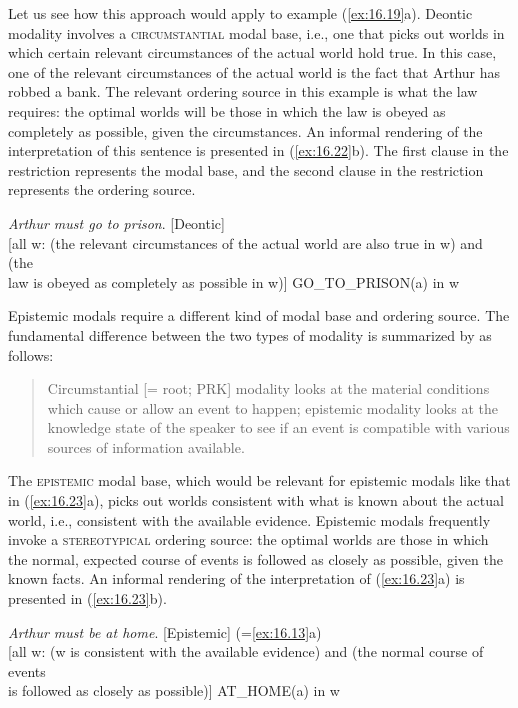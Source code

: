 Let us see how this approach would apply to example (\ref{ex:16.19}a). Deontic modality involves a \textsc{circumstantial} modal base, i.e., one that picks out worlds in which certain relevant circumstances of the actual world hold true. In this case, one of the relevant circumstances of the actual world is the fact that Arthur has robbed a bank. The relevant ordering source in this example is what the law requires: the optimal worlds will be those in which the law is obeyed as completely as possible, given the circumstances. An informal rendering of the interpretation of this sentence is presented in (\ref{ex:16.22}b). The first clause in the restriction represents the modal base, and the second clause in the restriction represents the ordering source.


\ea \label{ex:16.22}
\ea  \textit{Arthur must go to prison}.  [Deontic]\\
\ex{} [all w: (the relevant circumstances of the actual world are also true in w) and (the \\
  law is obeyed as completely as possible in w)] GO\_TO\_PRISON(a) in w
\z
\z


Epistemic modals require a different kind of modal base and ordering source. The fundamental difference between the two types of modality is summarized by \citet[1494]{Hacquard2011} as follows:


\begin{quote}
Circumstantial [= root; PRK] modality looks at the material conditions which cause or allow an event to happen; epistemic modality looks at the knowledge state of the speaker to see if an event is compatible with various sources of information available.
\end{quote}


The \textsc{epistemic} modal base, which would be relevant for epistemic modals like that in (\ref{ex:16.23}a), picks out worlds consistent with what is known about the actual world, i.e., consistent with the available evidence. Epistemic modals frequently invoke a \textsc{stereotypical} ordering source: the optimal worlds are those in which the normal, expected course of events is followed as closely as possible, given the known facts. An informal rendering of the interpretation of (\ref{ex:16.23}a) is presented in (\ref{ex:16.23}b).


\ea \label{ex:16.23}
\ea  \textit{Arthur must be at home}.  [Epistemic]  (=\ref{ex:16.13}a)\\
\ex{} [all w: (w is consistent with the available evidence) and (the normal course of events \\
  is followed as closely as possible)] AT\_HOME(a) in w
\z
\z



